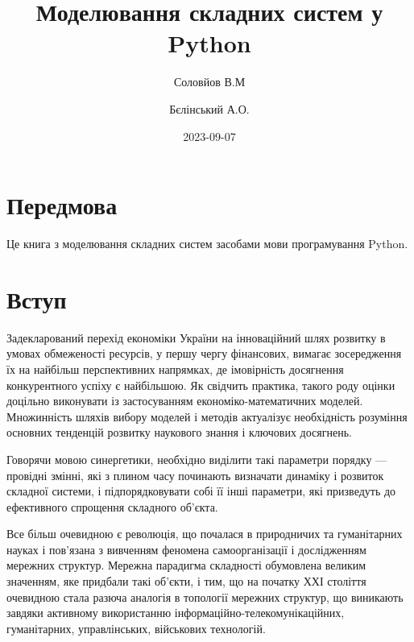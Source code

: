 \documentclass[
  letterpaper,
]{report}
\title{Моделювання складних систем у Python}
\author{Соловйов В.М \and Бєлінський А.О.}
\date{2023-09-07}
\renewcommand*\contentsname{Зміст}
\newcommand\contentsname{Зміст}
\begin{document}
\maketitle
\ifdefined\Shaded\renewenvironment{Shaded}{\begin{tcolorbox}[boxrule=0pt, interior hidden, borderline west={3pt}{0pt}{shadecolor}, breakable, enhanced, sharp corners, frame hidden]}{\end{tcolorbox}}\fi

\renewcommand*\contentsname{Зміст}
{
\hypersetup{linkcolor=}
\setcounter{tocdepth}{2}
\tableofcontents
}

\hypertarget{ux43fux435ux440ux435ux434ux43cux43eux432ux430}{%
\chapter*{Передмова}\label{ux43fux435ux440ux435ux434ux43cux43eux432ux430}}


Це книга з моделювання складних систем засобами мови програмування
Python.


\hypertarget{ux432ux441ux442ux443ux43f}{%
\chapter{Вступ}\label{ux432ux441ux442ux443ux43f}}

Задекларований перехід економіки України на інноваційний шлях розвитку в
умовах обмеженості ресурсів, у першу чергу фінансових, вимагає
зосередження їх на найбільш перспективних напрямках, де імовірність
досягнення конкурентного успіху є найбільшою. Як свідчить практика,
такого роду оцінки доцільно виконувати із застосуванням
економіко-математичних моделей. Множинність шляхів вибору моделей і
методів актуалізує необхідність розуміння основних тенденцій розвитку
наукового знання і ключових досягнень.

Говорячи мовою синергетики, необхідно виділити такі параметри порядку
--- провідні змінні, які з плином часу починають визначати динаміку і
розвиток складної системи, і підпорядковувати собі її інші параметри,
які призведуть до ефективного спрощення складного об'єкта.

Все більш очевидною є революція, що почалася в природничих та
гуманітарних науках і пов'язана з вивченням феномена самоорганізації і
дослідженням мережних структур. Мережна парадигма складності обумовлена
великим значенням, яке придбали такі об'єкти, і тим, що на початку ХХІ
століття очевидною стала разюча аналогія в топології мережних структур,
що виникають завдяки активному використанню
інформаційно-телекомунікаційних, гуманітарних, управлінських, військових
технологій.
\end{document}
